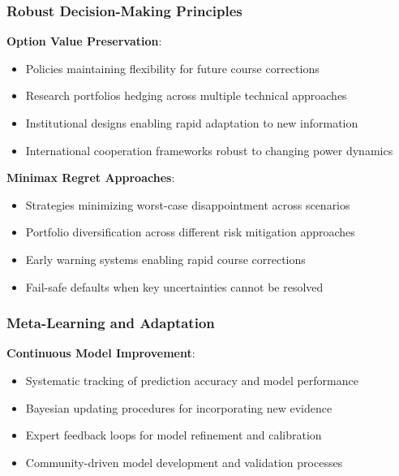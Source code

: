 \documentclass[
  11pt,
  letterpaper,
]{book}
\providecommand{\tightlist}{%
  \setlength{\itemsep}{0pt}\setlength{\parskip}{0pt}}
\begin{document}
\subsubsection{Robust Decision-Making
Principles}\label{sec-robust-principles}

\textbf{Option Value Preservation}:

\begin{itemize}
\tightlist
\item
  Policies maintaining flexibility for future course corrections
\item
  Research portfolios hedging across multiple technical approaches
\item
  Institutional designs enabling rapid adaptation to new information
\item
  International cooperation frameworks robust to changing power dynamics
\end{itemize}

\textbf{Minimax Regret Approaches}:

\begin{itemize}
\tightlist
\item
  Strategies minimizing worst-case disappointment across scenarios
\item
  Portfolio diversification across different risk mitigation approaches
\item
  Early warning systems enabling rapid course corrections
\item
  Fail-safe defaults when key uncertainties cannot be resolved
\end{itemize}

\subsubsection{Meta-Learning and Adaptation}\label{sec-meta-learning}

\textbf{Continuous Model Improvement}:

\begin{itemize}
\tightlist
\item
  Systematic tracking of prediction accuracy and model performance
\item
  Bayesian updating procedures for incorporating new evidence
\item
  Expert feedback loops for model refinement and calibration
\item
  Community-driven model development and validation processes
\end{itemize}
\end{document}
